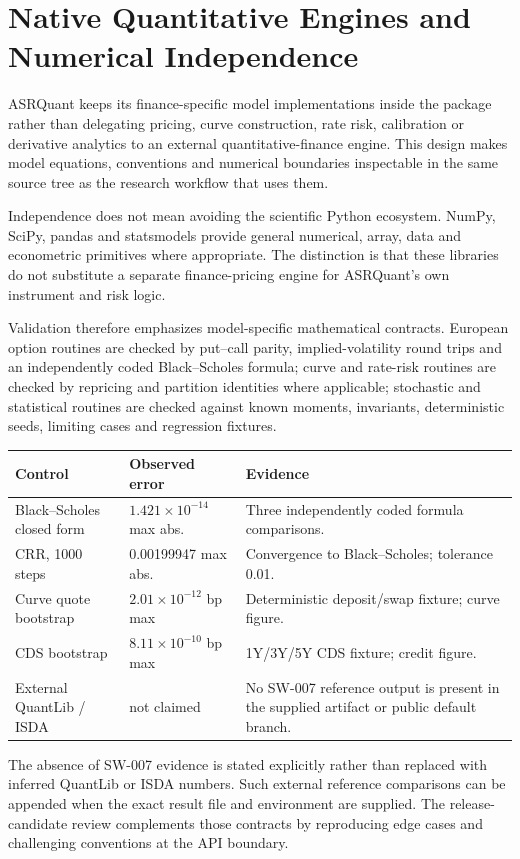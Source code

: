 \documentclass{asrpaper}
\begin{document}
\section{Native Quantitative Engines and Numerical Independence}
ASRQuant keeps its finance-specific model implementations inside the package rather than delegating pricing, curve construction, rate risk, calibration or derivative analytics to an external quantitative-finance engine. This design makes model equations, conventions and numerical boundaries inspectable in the same source tree as the research workflow that uses them.

Independence does not mean avoiding the scientific Python ecosystem. NumPy, SciPy, pandas and statsmodels provide general numerical, array, data and econometric primitives where appropriate. The distinction is that these libraries do not substitute a separate finance-pricing engine for ASRQuant's own instrument and risk logic.

Validation therefore emphasizes model-specific mathematical contracts. European option routines are checked by put--call parity, implied-volatility round trips and an independently coded Black--Scholes formula; curve and rate-risk routines are checked by repricing and partition identities where applicable; stochastic and statistical routines are checked against known moments, invariants, deterministic seeds, limiting cases and regression fixtures.

\begin{center}\scriptsize
\begin{tabularx}{\columnwidth}{@{}p{}p{}X@{}}
\toprule
\textbf{Control} & \textbf{Observed error} & \textbf{Evidence} \\
\midrule
Black--Scholes closed form & $1.421\times10^{-14}$ max abs. & Three independently coded formula comparisons. \\
CRR, 1000 steps & 0.00199947 max abs. & Convergence to Black--Scholes; tolerance 0.01. \\
Curve quote bootstrap & $2.01\times10^{-12}$ bp max & Deterministic deposit/swap fixture; curve figure. \\
CDS bootstrap & $8.11\times10^{-10}$ bp max & 1Y/3Y/5Y CDS fixture; credit figure. \\
External QuantLib / ISDA & not claimed & No SW-007 reference output is present in the supplied artifact or public default branch. \\
\bottomrule
\end{tabularx}
\end{center}
The absence of SW-007 evidence is stated explicitly rather than replaced with inferred QuantLib or ISDA numbers. Such external reference comparisons can be appended when the exact result file and environment are supplied. The release-candidate review complements those contracts by reproducing edge cases and challenging conventions at the API boundary.
\end{document}

